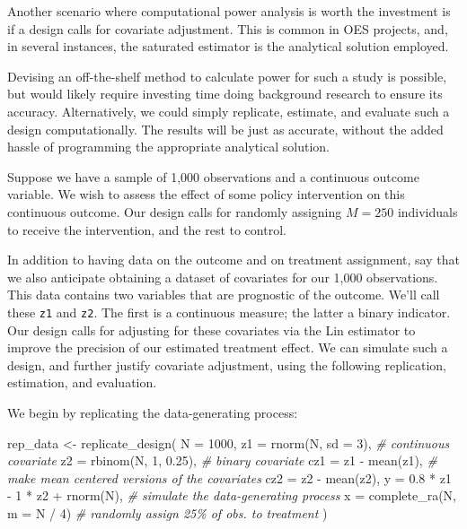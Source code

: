 \documentclass[
  12pt,
]{book}
\newenvironment{Shaded}{\begin{snugshade}}{\end{snugshade}}
\newcommand{\AttributeTok}[1]{\textcolor[rgb]{0.77,0.63,0.00}{#1}}
\newcommand{\CommentTok}[1]{\textcolor[rgb]{0.56,0.35,0.01}{\textit{#1}}}
\newcommand{\DecValTok}[1]{\textcolor[rgb]{0.00,0.00,0.81}{#1}}
\newcommand{\FloatTok}[1]{\textcolor[rgb]{0.00,0.00,0.81}{#1}}
\newcommand{\FunctionTok}[1]{\textcolor[rgb]{0.00,0.00,0.00}{#1}}
\newcommand{\NormalTok}[1]{#1}
\newcommand{\OtherTok}[1]{\textcolor[rgb]{0.56,0.35,0.01}{#1}}
\newcommand{\SpecialCharTok}[1]{\textcolor[rgb]{0.00,0.00,0.00}{#1}}
\theoremstyle{definition}
\theoremstyle{definition}
\theoremstyle{definition}
\theoremstyle{remark}
\begin{document}
Another scenario where computational power analysis is worth the
investment is if a design calls for covariate adjustment. This is common
in OES projects, and, in several instances, the
\citet{lin_agnostic_2013} saturated estimator is the analytical solution
employed.

Devising an off-the-shelf method to calculate power for such a study is
possible, but would likely require investing time doing background
research to ensure its accuracy. Alternatively, we could simply
replicate, estimate, and evaluate such a design computationally. The
results will be just as accurate, without the added hassle of
programming the appropriate analytical solution.

Suppose we have a sample of 1,000 observations and a continuous outcome
variable. We wish to assess the effect of some policy intervention on
this continuous outcome. Our design calls for randomly assigning
\(M = 250\) individuals to receive the intervention, and the rest to
control.

In addition to having data on the outcome and on treatment assignment,
say that we also anticipate obtaining a dataset of covariates for our
1,000 observations. This data contains two variables that are prognostic
of the outcome. We'll call these \texttt{z1} and \texttt{z2}. The first
is a continuous measure; the latter a binary indicator. Our design calls
for adjusting for these covariates via the Lin estimator to improve the
precision of our estimated treatment effect. We can simulate such a
design, and further justify covariate adjustment, using the following
replication, estimation, and evaluation.

We begin by replicating the data-generating process:

\begin{Shaded}
\begin{Highlighting}[]
\NormalTok{rep\_data }\OtherTok{\textless{}{-}}
  \FunctionTok{replicate\_design}\NormalTok{(}
    \AttributeTok{N =} \DecValTok{1000}\NormalTok{,}
    \AttributeTok{z1 =} \FunctionTok{rnorm}\NormalTok{(N, }\AttributeTok{sd =} \DecValTok{3}\NormalTok{), }\CommentTok{\# continuous covariate}
    \AttributeTok{z2 =} \FunctionTok{rbinom}\NormalTok{(N, }\DecValTok{1}\NormalTok{, }\FloatTok{0.25}\NormalTok{), }\CommentTok{\# binary covariate}
    \AttributeTok{cz1 =}\NormalTok{ z1 }\SpecialCharTok{{-}} \FunctionTok{mean}\NormalTok{(z1), }\CommentTok{\# make mean centered versions of the covariates}
    \AttributeTok{cz2 =}\NormalTok{ z2 }\SpecialCharTok{{-}} \FunctionTok{mean}\NormalTok{(z2),}
    \AttributeTok{y =} \FloatTok{0.8} \SpecialCharTok{*}\NormalTok{ z1 }\SpecialCharTok{{-}} \DecValTok{1} \SpecialCharTok{*}\NormalTok{ z2 }\SpecialCharTok{+} \FunctionTok{rnorm}\NormalTok{(N), }\CommentTok{\# simulate the data{-}generating process}
    \AttributeTok{x =} \FunctionTok{complete\_ra}\NormalTok{(N, }\AttributeTok{m =}\NormalTok{ N }\SpecialCharTok{/} \DecValTok{4}\NormalTok{) }\CommentTok{\# randomly assign 25\% of obs. to treatment}
\NormalTok{  )}
\end{Highlighting}
\end{Shaded}
\end{document}
